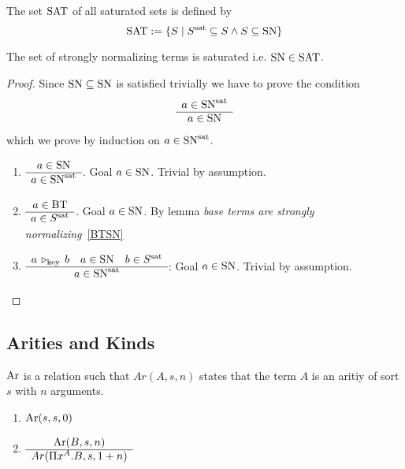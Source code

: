 \begin{definition}
  The set $\text{SAT}$ of all saturated sets is defined by
  $$
  \text{SAT} := \{S \mid  S^{\text{sat}} \subseteq S \land S \subseteq \text{SN} \}
  $$
\end{definition}


\begin{lemma}
  \label{SNinSAT}
  The set of strongly normalizing terms is saturated i.e. $\text{SN} \in \text{SAT}$.

  \begin{proof} Since $\text{SN} \subseteq \text{SN}$ is satisfied trivially we have to
    prove the condition
    $$
    \begin{array}{c} a \in \text{SN}^{\text{sat}} \\ \hline a \in \text{SN}\end{array}
    $$
    which we prove by induction on $a \in \text{SN}^{\text{sat}}$.

    \begin{enumerate}
    \item $\begin{array}{c} a \in \text{SN} \\ \hline a \in \text{SN}^{\text{sat}}\end{array}$. Goal $a \in \text{SN}$. Trivial by
      assumption.

    \item $\begin{array}{c} a \in \text{BT} \\ \hline a \in S^{\text{sat}}\end{array}$. Goal $a \in \text{SN}$. By lemma
      \emph{base terms are strongly normalizing}~\ref{BTSN}

    \item $\begin{array}{c} a \,\triangleright_{\text{key}}\, b \quad a \in \text{SN} \quad b \in S^{\text{sat}} \\ \hline a \in \text{SN}^{\text{sat}}\end{array}$: Goal $a \in \text{SN}$. Trivial by assumption.
    \end{enumerate}
  \end{proof}
\end{lemma}





\subsection{Arities and Kinds}

\begin{definition} %
  $\text{Ar}$ is a relation such that $Ar(A,s,n)$ states that the term $A$ is an
  aritiy of sort $s$ with $n$ arguments.

  \begin{enumerate}

  \item $\text{Ar}(s,s,0)$

  \item $\begin{array}{c} \text{Ar}(B,s,n) \\ \hline Ar(\Pi x^A.B, s, 1+n)\end{array}$
  \end{enumerate}

\end{definition}



